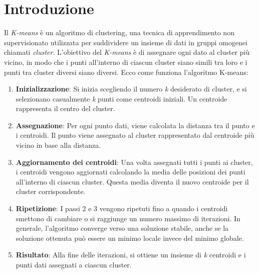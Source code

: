 \section{Introduzione}

Il \textit{K-means} è un algoritmo di clustering, una tecnica di apprendimento non supervisionato utilizzata per suddividere un insieme di dati in gruppi omogenei chiamati \textit{cluster}. 
L'obiettivo del \textit{K-means} è di assegnare ogni dato al cluster più vicino, in modo che i punti all'interno di ciascun cluster siano simili tra loro e i punti tra cluster diversi siano diversi. 
Ecco come funziona l'algoritmo K-means: 
\begin{enumerate}
  \item \textbf{Inizializzazione}: Si inizia scegliendo il numero \textit{k} desiderato di cluster, e si selezionano casualmente \textit{k} punti come centroidi iniziali. Un centroide rappresenta il centro del cluster.
  \item \textbf{Assegnazione}: Per ogni punto dati, viene calcolata la distanza tra il punto e i centroidi. Il punto viene assegnato al cluster rappresentato dal centroide più vicino in base alla distanza.
  \item \textbf{Aggiornamento dei centroidi}: Una volta assegnati tutti i punti ai cluster, i centroidi vengono aggiornati calcolando la media delle posizioni dei punti all'interno di ciascun cluster. Questa media diventa il nuovo centroide per il cluster corrispondente.
  \item \textbf{Ripetizione}: I passi 2 e 3 vengono ripetuti fino a quando i centroidi smettono di cambiare o si raggiunge un numero massimo di iterazioni. In generale, l'algoritmo converge verso una soluzione stabile, anche se la soluzione ottenuta può essere un minimo locale invece del minimo globale.
  \item \textbf{Risultato}: Alla fine delle iterazioni, si ottiene un insieme di \textit{k} centroidi e i punti dati assegnati a ciascun cluster.
\end{enumerate}